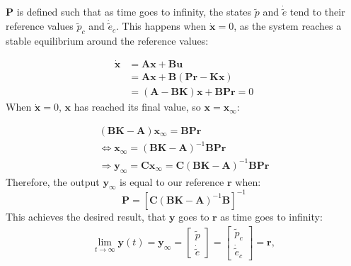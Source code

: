 $\boldsymbol{P}$ is defined such that as time goes to infinity, the
states $\tilde{p}$ and $\dot{\tilde{e}}$ tend to their reference
values $\tilde{p}_c$ and $\dot{\tilde{e}}_c$. This happens when
$\dot{\boldsymbol{x}} = 0$, as the system reaches a stable equilibrium
around the reference values:

\begin{align*}
  \dot{\boldsymbol{x}} &= \boldsymbol{Ax} + \boldsymbol{Bu} \\
                       &= \boldsymbol{Ax} +
                         \boldsymbol{B}(\boldsymbol{Pr} -
                         \boldsymbol{Kx}) \\
                       &= (\boldsymbol{A}-\boldsymbol{BK})\boldsymbol{x}
                         + \boldsymbol{BPr} = 0
\end{align*}
When $\boldsymbol{\dot{x}} = 0$, $\boldsymbol{x}$ has reached its
final value, so $\boldsymbol{x} = \boldsymbol{x_\infty}$:

\begin{align*}
  (\boldsymbol{BK} - \boldsymbol{A})\boldsymbol{x_\infty} = \boldsymbol{BPr} \\
  \Leftrightarrow \boldsymbol{x_\infty} = (\boldsymbol{BK} - \boldsymbol{A})^{-1}\boldsymbol{BPr} \\
  \Rightarrow \boldsymbol{y_\infty} = \boldsymbol{Cx_\infty} = \boldsymbol{C}(\boldsymbol{BK} - \boldsymbol{A})^{-1}\boldsymbol{BPr}
\end{align*}
Therefore, the output $\boldsymbol{y_\infty}$ is equal to our reference $\boldsymbol{r}$ when:
\begin{equation}
  \boldsymbol{P} = [\boldsymbol{C}(\boldsymbol{BK} - \boldsymbol{A})^{-1}\boldsymbol{B}]^{-1}
\end{equation}
This achieves the desired result, that $\boldsymbol{y}$  goes to $\boldsymbol{r}$  as time goes to infinity:
\begin{align*}
  \lim_{t\to\infty}\boldsymbol{y}(t) = \boldsymbol{y_\infty} =
  \begin{bmatrix}
    \tilde{p} \\
    \dot{\tilde{e}}
  \end{bmatrix}
  =
  \begin{bmatrix}
    \tilde{p}_c \\
    \dot{\tilde{e}}_c
  \end{bmatrix}
  = \boldsymbol{r},
\end{align*}
